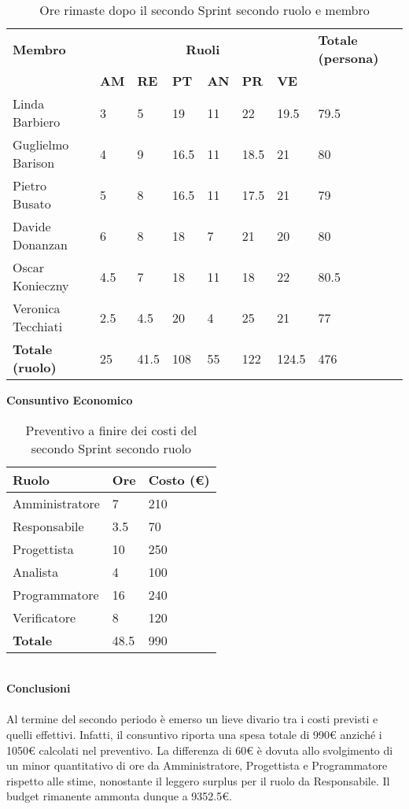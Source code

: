 \begin{table}[ht!]
	\centering
	\begin{tabular}{p{4cm} p{1cm} p{1cm} p{1cm} p{1cm} p{1cm} p{1cm} p{3cm}}
		\toprule
        \textbf{Membro} & \multicolumn{6}{c}{\textbf{Ruoli}} & \textbf{Totale (persona)}\\
		& \textbf{AM} & \textbf{RE} & \textbf{PT} & \textbf{AN} & \textbf{PR} & \textbf{VE}\\
		\midrule
        Linda Barbiero          & 3     & 5     & 19     & 11   & 22     & 19.5   & 79.5 \\
        Guglielmo Barison       & 4     & 9     & 16.5     & 11   & 18.5   & 21     & 80\\
        Pietro Busato           & 5     & 8     & 16.5     & 11   & 17.5   & 21     & 79\\
        Davide Donanzan         & 6     & 8     & 18     & 7    & 21     & 20     & 80\\
        Oscar Konieczny         & 4.5   & 7     & 18     & 11   & 18     & 22     & 80.5\\
        Veronica Tecchiati      & 2.5   & 4.5     & 20     & 4    & 25     & 21     & 77\\
        \bottomrule
        \textbf{Totale (ruolo)} & 25    & 41.5    & 108    & 55   & 122     & 124.5 & 476 \\
	\end{tabular}
	\caption{Ore rimaste dopo il secondo Sprint secondo ruolo e membro}
	\label{table:Ore rimaste dopo il secondo Sprint secondo ruolo e membro}
\end{table}
\textbf{Consuntivo Economico}
\begin{table}[ht!]
	\centering
	\begin{tabular}{p{4cm} p{1cm} p{2cm}}
        \toprule
        \textbf{Ruolo} & \textbf{Ore} & \textbf{Costo (€)} \\
        \midrule
        Amministratore & 7 & 210 \\
        Responsabile & 3.5 & 70 \\
        Progettista & 10 & 250 \\
        Analista & 4 & 100 \\
        Programmatore & 16 & 240 \\
        Verificatore & 8 & 120 \\
        \bottomrule
        \textbf{Totale} & 48.5 & 990
    \end{tabular}
    \caption{Preventivo a finire dei costi del secondo Sprint secondo ruolo}
	\label{table:Preventivo a finire dei costi del secondo Sprint secondo ruolo}
\end{table}
\\
\textbf{Conclusioni}
\\\\
Al termine del secondo periodo è emerso un lieve divario tra i costi previsti e quelli effettivi. Infatti, il consuntivo riporta una spesa totale di 990€ anziché i 1050€ calcolati nel preventivo. La differenza di 60€ è dovuta allo svolgimento di un minor quantitativo di ore da Amministratore, Progettista e Programmatore rispetto alle stime, nonostante il leggero surplus per il ruolo da Responsabile.
Il budget rimanente ammonta dunque a 9352.5€. 

